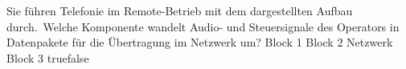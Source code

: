     {Sie führen Telefonie im Remote-Betrieb mit dem dargestellten Aufbau durch. Welche Komponente wandelt Audio- und Steuersignale des Operators in Datenpakete für die Übertragung im Netzwerk um?}
    {Block 1}
    {Block 2}
    {Netzwerk}
    {Block 3}
    {true}{false}